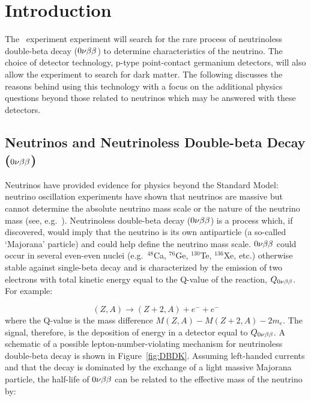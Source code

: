 
\chapter{Introduction}
	\label{chap:IntroChapter}

	The \MJ~experiment experiment will search for the rare process of 
neutrinoless double-beta decay ($0 \nu \beta \beta$) to determine characteristics of the neutrino.  The 
choice of detector technology, p-type point-contact germanium detectors, 
will also allow the experiment to search for dark matter.  
The following discusses the reasons behind using this technology with a focus on the
additional physics questions beyond those related to neutrinos which may be answered with these detectors.

	\section{Neutrinos and Neutrinoless Double-beta Decay\texorpdfstring{ ($0 \nu \beta \beta$)}{}}
	
	Neutrinos have provided evidence for physics beyond the Standard Model: 
neutrino oscillation experiments have shown that neutrinos are massive but
cannot determine the absolute neutrino mass scale or the nature of the neutrino
mass (see, e.g.~\cite{Camilleri:2008zz}).  Neutrinoless double-beta decay ($0 \nu \beta \beta$) is a
process which, if discovered, would imply that the neutrino is its own
antiparticle (a so-called `Majorana' particle) and could help define the neutrino
mass scale.  $0 \nu \beta \beta$ could occur in several even-even nuclei (e.g.~$^{48}$Ca,
$^{76}$Ge, $^{130}$Te, $^{136}$Xe, etc.) otherwise stable against
single-beta decay and is characterized by the emission of two electrons with
total kinetic energy equal to the Q-value of the reaction, $Q_{0 \nu \beta \beta}$.  For example:

		\begin{equation}
		(Z,A) \rightarrow (Z+2,A) + e^- + e^-
		\end{equation} 
where the Q-value is the mass difference $M(Z,A)-M(Z+2,A)-2m_e$.  The signal, therefore, 
is the deposition of energy in a detector equal to $Q_{0 \nu \beta \beta}$.
A schematic of a possible lepton-number-violating mechanism for neutrinoless double-beta
decay is shown in Figure~\ref{fig:DBDK}.  Assuming left-handed currents and
that the decay is dominated by the exchange of a light massive Majorana
particle, the half-life of $0 \nu \beta \beta$ can be related to the effective mass of
the neutrino by:

